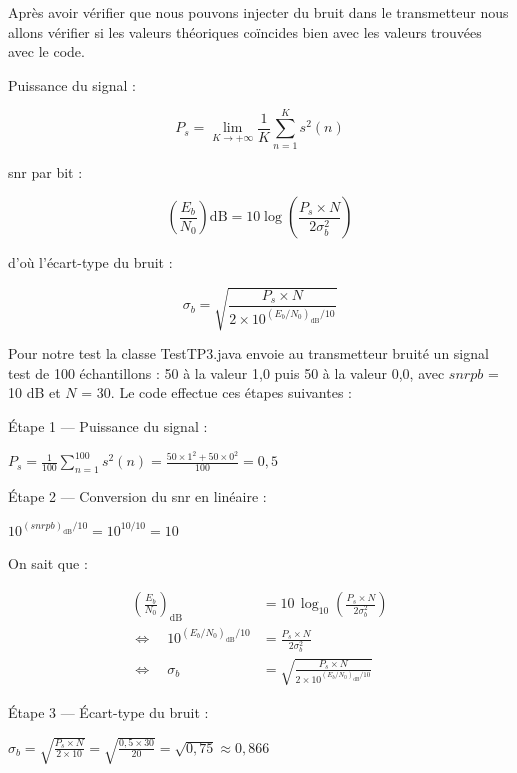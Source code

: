 \documentclass[a4paper,12pt]{report}
\begin{document}
Après avoir vérifier que nous pouvons injecter du bruit dans le transmetteur nous allons vérifier si les valeurs théoriques coïncides bien avec les valeurs trouvées avec le code. 

Puissance du signal :

$$P_s = \lim_{K \to +\infty} \frac{1}{K}\sum_{n=1}^{K} s^2(n)$$

\gls{snr} par bit :

$$\left(\frac{E_b}{N_0}\right){\text{dB}} = 10\log{}\left(\frac{P_s \times N}{2\sigma_b^2}\right)$$

d'où l'écart-type du bruit :

$$\sigma_b = \sqrt{\frac{P_s \times N}{2 \times 10^{(E_b/N_0)_{\text{dB}}/10}}}$$

Pour notre test la classe TestTP3.java envoie au transmetteur bruité un signal test de 100 échantillons : 50 à la valeur 1,0 puis 50 à la valeur 0,0, avec $snrpb$ = 10 dB et $N$ = 30. Le code effectue ces étapes suivantes :

\vspace{0.5cm}

Étape 1 — Puissance du signal :

$P_s = \frac{1}{100}\sum_{n=1}^{100} s^2(n) = \frac{50 \times 1^2 + 50 \times 0^2}{100} = 0{,}5$

\vspace{0.5cm}

Étape 2 — Conversion du \gls{snr} en linéaire :

$10^{(snrpb)_{\text{dB}}/10} = 10^{10/10} = 10$

\vspace{0.5cm}

On sait que : 

\begin{align*}
\left(\frac{E_b}{N_0}\right)_{\text{dB}}
    &= 10\,\log_{10}\left(\frac{P_s \times N}{2\sigma_b^2}\right)\\[4pt]
\Longleftrightarrow \quad
10^{(E_b/N_0)_{\text{dB}}/10}
    &= \frac{P_s \times N}{2\sigma_b^2}\\[4pt]
\Longleftrightarrow \quad
\sigma_b
    &= \sqrt{\frac{P_s \times N}{2 \times 10^{(E_b/N_0)_{\text{dB}}/10}}}
\end{align*}

Étape 3 — Écart-type du bruit :

$\sigma_b = \sqrt{\frac{P_s \times N}{2 \times 10}} = \sqrt{\frac{0{,}5 \times 30}{20}} = \sqrt{0{,}75} \approx 0{,}866$

\vspace{0.5cm}
\end{document}
